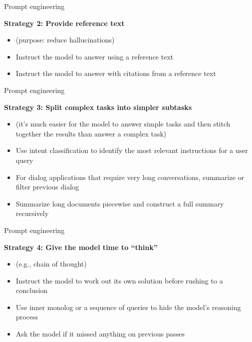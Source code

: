 \documentclass[11pt,compress,t,notes=noshow, xcolor=table]{beamer}
\begin{document}
\begin{vbframe}{Prompt engineering}

\vfill

\textbf{Strategy 2: Provide reference text}


\begin{itemize}
\item (purpose: reduce hallucinations)
\item     Instruct the model to answer using a reference text
\item         Instruct the model to answer with citations from a
        reference text

\end{itemize}

\vfill

\end{vbframe}
\begin{vbframe}{Prompt engineering}

\vfill

\textbf{Strategy 3: Split complex tasks into simpler subtasks}


\begin{itemize}

\item (it's much easier for the model to answer simple tasks
and then stitch together the results than answer a  complex task)
\item     Use intent classification to identify the most relevant
    instructions for a user query
\item         For dialog applications that require very long
    conversations, summarize or filter previous dialog
\item         Summarize long documents piecewise and construct a
    full summary recursively

\end{itemize}

\vfill

\end{vbframe}
\begin{vbframe}{Prompt engineering}

\vfill

\textbf{Strategy 4: Give the model time to ``think''}


\begin{itemize}

\item (e.g., chain of thought)
\item     Instruct the model to work out its own solution before
    rushing to a conclusion
\item         Use inner monolog or a sequence of queries to hide
    the model's reasoning process
\item         Ask the model if it missed anything on previous passes

\end{itemize}

\vfill

\end{vbframe}
\end{document}
